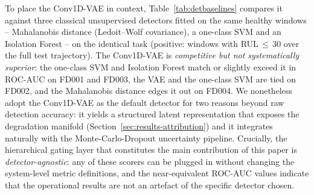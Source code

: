 \documentclass[5p,times,authoryear]{elsarticle}
\begin{document}
To place the Conv1D-VAE in context, Table~\ref{tab:detbaselines} compares it against three classical unsupervised detectors fitted on the same healthy windows -- Mahalanobis distance (Ledoit--Wolf covariance), a one-class SVM and an Isolation Forest -- on the identical task (positive: windows with RUL\,$\le$\,30 over the full test trajectory). The Conv1D-VAE is \emph{competitive but not systematically superior}: the one-class SVM and Isolation Forest match or slightly exceed it in ROC-AUC on FD001 and FD003, the VAE and the one-class SVM are tied on FD002, and the Mahalanobis distance edges it out on FD004. We nonetheless adopt the Conv1D-VAE as the default detector for two reasons beyond raw detection accuracy: it yields a structured latent representation that exposes the degradation manifold (Section~\ref{sec:results-attribution}) and it integrates naturally with the Monte-Carlo-Dropout uncertainty pipeline. Crucially, the hierarchical gating layer that constitutes the main contribution of this paper is \emph{detector-agnostic}: any of these scorers can be plugged in without changing the system-level metric definitions, and the near-equivalent ROC-AUC values indicate that the operational results are not an artefact of the specific detector chosen.
\end{document}
